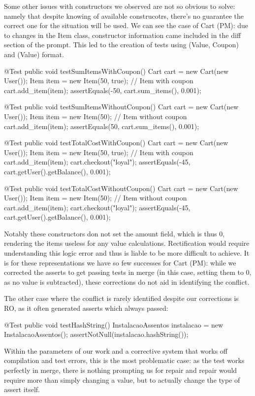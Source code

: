 Some other issues with constructors we observed are not so obvious to solve: namely that despite knowing of available construcotrs, there's no guarantee
the correct one for the situation will be used. We can see the case of Cart (PM): due to changes in the Item class, constructor information came included
in the diff section of the prompt. This led to the creation of tests using (Value, Coupon) and (Value) format.
\begin{response}
    @Test
    public void testSumItemsWithCoupon() {
        Cart cart = new Cart(new User());
        Item item = new Item(50, true); // Item with coupon
        cart.add_item(item);
        assertEquals(-50, cart.sum_items(), 0.001);
    }

    @Test
    public void testSumItemsWithoutCoupon() {
        Cart cart = new Cart(new User());
        Item item = new Item(50); // Item without coupon
        cart.add_item(item);
        assertEquals(50, cart.sum_items(), 0.001);
    }

    @Test
    public void testTotalCostWithCoupon() {
        Cart cart = new Cart(new User());
        Item item = new Item(50, true); // Item with coupon
        cart.add_item(item);
        cart.checkout("loyal");
        assertEquals(-45, cart.getUser().getBalance(), 0.001);
    }

    @Test
    public void testTotalCostWithoutCoupon() {
        Cart cart = new Cart(new User());
        Item item = new Item(50); // Item without coupon
        cart.add_item(item);
        cart.checkout("loyal");
        assertEquals(-45, cart.getUser().getBalance(), 0.001);
    }
\end{response}
Notably these constructors don not set the amount field, which is thus 0, rendering the items useless for any value calculations.
Rectification would require understanding this logic error and thus is liable to be more difficult to achieve. It is for these representations
we have so few successes for Cart (PM): while we corrected the asserts to get passing tests in merge (in this case, setting them to 0, as no
value is subtracted), these corrections do not aid in identifying the conflict.

The other case where the conflict is rarely identified despite our corrections is RO, as it often generated asserts which always passed:
\begin{response}
@Test
public void testHashString() {
    InstalacaoAssentos instalacao = new InstalacaoAssentos();
    assertNotNull(instalacao.hashString());
}
\end{response}
Within the parameters of our work and a corrective system that works off compilation and test errors, this is the most problematic case: as the test works perfectly in merge,
there is nothing prompting us for repair and repair would require more than simply changing a value, but to actually change the type of assert itself.

